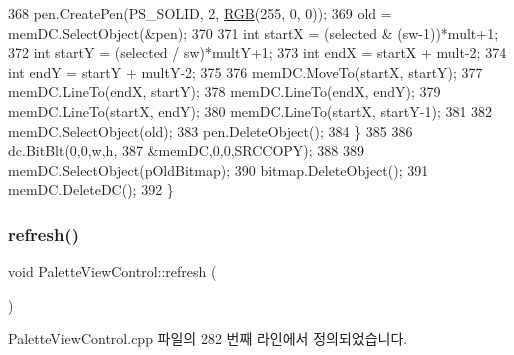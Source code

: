 \begin{DoxyCode}
368     pen.CreatePen(PS\_SOLID, 2, \mbox{\hyperlink{bilinear_8cpp_a4a118ad3ee36468a3fa616977a64864e}{RGB}}(255, 0, 0));
369     old = memDC.SelectObject(&pen);
370 
371     \textcolor{keywordtype}{int} startX = (selected & (sw-1))*mult+1;
372     \textcolor{keywordtype}{int} startY = (selected / sw)*multY+1;
373     \textcolor{keywordtype}{int} endX = startX + mult-2;
374     \textcolor{keywordtype}{int} endY = startY + multY-2;
375     
376     memDC.MoveTo(startX, startY);
377     memDC.LineTo(endX, startY);
378     memDC.LineTo(endX, endY);
379     memDC.LineTo(startX, endY);
380     memDC.LineTo(startX, startY-1);
381 
382     memDC.SelectObject(old);
383     pen.DeleteObject();
384   \}
385   
386   dc.BitBlt(0,0,w,h,
387             &memDC,0,0,SRCCOPY);
388 
389   memDC.SelectObject(pOldBitmap);
390   bitmap.DeleteObject();
391   memDC.DeleteDC();
392 \}
\end{DoxyCode}
\mbox{\label{class_palette_view_control_aace3ab97afe8216b3873159ee852779f}} 
\subsubsection{\texorpdfstring{refresh()}{refresh()}}
{\footnotesize\ttfamily void Palette\+View\+Control\+::refresh (\begin{DoxyParamCaption}{ }\end{DoxyParamCaption})}



Palette\+View\+Control.\+cpp 파일의 282 번째 라인에서 정의되었습니다.


